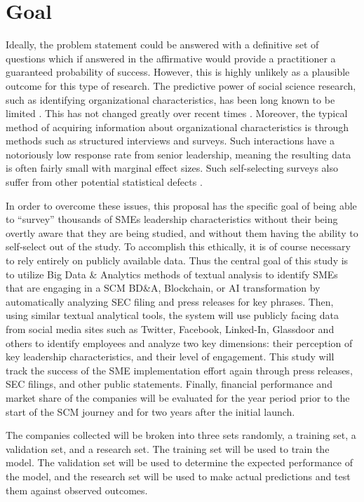 \section{Goal}

Ideally, the problem statement could be answered with a definitive set of questions which if answered in the affirmative would provide a practitioner a guaranteed probability of success. However, this is highly unlikely as a plausible outcome for this type of research. The predictive power of social science research, such as identifying organizational characteristics, has been long known to be limited \parencite{KimballYoungMethod}. This has not changed greatly over recent times \parencite{taageperaMakingSocialSciences2008}. Moreover, the typical method of acquiring information about organizational characteristics is through methods such as structured interviews and surveys. Such interactions have a notoriously low response rate from senior leadership, meaning the resulting data is often fairly small with marginal effect sizes. Such self-selecting surveys also suffer from other potential statistical defects \parencite{zikmund1997business}.

In order to overcome these issues, this proposal has the specific goal of being able to ``survey'' thousands of SMEs leadership characteristics without their being overtly aware that they are being studied, and without them having the ability to self-select out of the study. To accomplish this ethically, it is of course necessary to rely entirely on publicly available data. Thus the central goal of this study is to utilize Big Data \& Analytics methods of textual analysis to identify SMEs that are engaging in a SCM BD\&A, Blockchain, or AI transformation by automatically analyzing SEC filing and press releases for key phrases. Then, using similar textual analytical tools, the system will use publicly facing data from social media sites such as Twitter, Facebook, Linked-In, Glassdoor and others to identify employees and analyze two key dimensions: their perception of key leadership characteristics, and their level of engagement. This study will track the success of the SME implementation effort again through press releases, SEC filings, and other public statements. Finally, financial performance and market share of the companies will be evaluated for the year period prior to the start of the SCM journey and for two years after the initial launch.

The companies collected will be broken into three sets randomly, a training set, a validation set, and a research set. The training set will be used to train the model. The validation set will be used to determine the expected performance of the model, and the research set will be used to make actual predictions and test them against observed outcomes.

